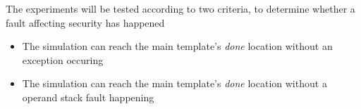 The experiments will be tested according to two criteria, to determine whether a fault affecting security has happened

\begin{itemize}
\item The simulation can reach the main template's \textit{done} location without an exception occuring
\item The simulation can reach the main template's \textit{done} location without a operand stack fault happening
\end{itemize}
